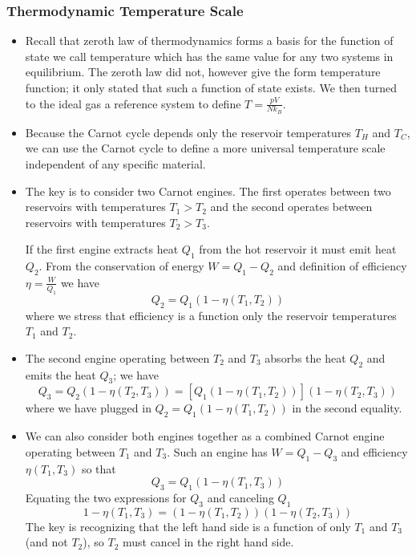 \documentclass[11pt, a4paper]{article}
\begin{document}
\subsubsection{Thermodynamic Temperature Scale}
\begin{itemize}
	\item Recall that zeroth law of thermodynamics forms a basis for the function of state we call temperature which has the same value for any two systems in equilibrium. The zeroth law did not, however give the form temperature function; it only stated that such a function of state exists. We then turned to the ideal gas a reference system to define $ T = \frac{pV}{Nk_{B}} $.
	
	\item Because the Carnot cycle depends only the reservoir temperatures $ T_{H} $ and $ T_{C} $, we can use the Carnot cycle to define a more universal temperature scale independent of any specific material.
	
	\item The key is to consider two Carnot engines. The first operates between two reservoirs with temperatures $ T_{1} > T_{2} $ and the second operates between reservoirs with temperatures $ T_{2} > T_{3} $. 
	
	If the first engine extracts heat $ Q_{1} $ from the hot reservoir it must emit heat $ Q_{2} $. From the conservation of energy $ W = Q_{1} - Q_{2} $ and definition of efficiency $ \eta = \frac{W}{Q_{1}} $ we have
	\begin{equation*}
		Q_{2} = Q_{1}(1 - \eta(T_{1}, T_{2}))
	\end{equation*}
	where we stress that efficiency is a function only the reservoir temperatures $ T_{1} $ and $ T_{2} $.
	
	\item The second engine operating between $ T_{2} $ and $ T_{3} $ absorbs the heat $ Q_{2} $ and emits the heat $ Q_{3} $; we have
	\begin{equation*}
		Q_{3} = Q_{2}(1 - \eta(T_{2}, T_{3})) = \left[Q_{1}(1 - \eta(T_{1}, T_{2}))\right](1 - \eta(T_{2}, T_{3}))
	\end{equation*}
	where we have plugged in $ Q_{2} = Q_{1}(1 - \eta(T_{1}, T_{2})) $ in the second equality.
	
	\item We can also consider both engines together as a combined Carnot engine operating between $ T_{1} $ and $ T_{3} $. Such an engine has $ W = Q_{1} - Q_{3} $ and efficiency $ \eta(T_{1}, T_{3}) $ so that
	\begin{equation*}
		Q_{3} = Q_{1}(1 - \eta(T_{1}, T_{3}))
	\end{equation*}
	Equating the two expressions for $ Q_{3} $ and canceling $ Q_{1} $ 
	\begin{equation*}
		1 - \eta(T_{1}, T_{3}) = (1 - \eta(T_{1}, T_{2}))(1 - \eta(T_{2}, T_{3}))
	\end{equation*}
	The key is recognizing that the left hand side is a function of only $ T_{1} $ and $ T_{3} $ (and not $ T_{2} $), so $ T_{2} $ must cancel in the right hand side. 
	

\end{itemize}
\end{document}
